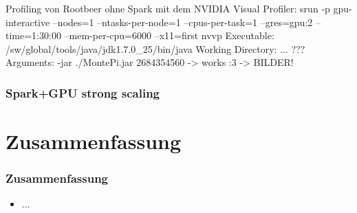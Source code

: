 \begin{frame}
Profiling von Rootbeer ohne Spark mit dem NVIDIA Visual Profiler:
    srun -p gpu-interactive --nodes=1 --ntasks-per-node=1 --cpus-per-task=1 --gres=gpu:2 --time=1:30:00 --mem-per-cpu=6000 --x11=first nvvp
    Executable: /sw/global/tools/java/jdk1.7.0_25/bin/java
    Working Directory: ... ???
    Arguments: -jar ./MontePi.jar 2684354560
       -> works :3
 -> BILDER!
\end{frame}

\begin{frame}
    \frametitle{Spark+GPU strong scaling}
\end{frame}

\section{Zusammenfassung}

\begin{frame}
	\frametitle{Zusammenfassung}
	\begin{itemize}
		\item ...
	\end{itemize}
\end{frame}



